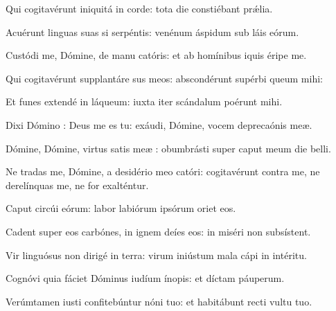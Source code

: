 \item {}

\item Qui cogitavérunt iniquitá in corde:\psstar{} tota die constiébant prǽlia.

\item Acuérunt linguas suas si serpéntis:\psstar{} venénum áspidum sub láis eórum.

\item Custódi me, Dómine, de manu catóris:\psstar{} et ab homínibus iquis éripe me.

\item Qui cogitavérunt supplantáre sus meos:\psstar{} abscondérunt supérbi queum mihi:

\item Et funes extendé in láqueum:\psstar{} iuxta iter scándalum poérunt mihi.

\item Dixi Dómino : Deus me es tu:\psstar{} exáudi, Dómine, vocem deprecaónis meæ.

\item Dómine, Dómine, virtus satis meæ :\psstar{} obumbrásti super caput meum  die belli.

\item Ne tradas me, Dómine, a desidério meo catóri:\psstar{} cogitavérunt contra me, ne derelínquas me, ne for exalténtur.

\item Caput circúi eórum:\psstar{} labor labiórum ipsórum oriet eos.

\item Cadent super eos carbónes,\pscross{} in ignem deíes eos:\psstar{} in miséri non subsístent.

\item Vir linguósus non dirigé in terra:\psstar{} virum iniústum mala cápi in intéritu.

\item Cognóvi quia fáciet Dóminus iudíum ínopis:\psstar{} et díctam páuperum.

\item Verúmtamen iusti confitebúntur nóni tuo:\psstar{} et habitábunt recti  vultu tuo.
